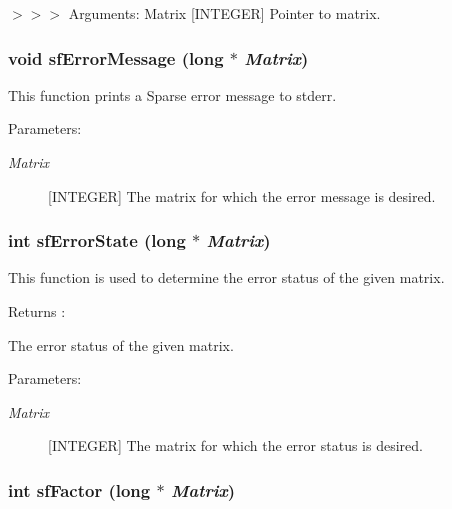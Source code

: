 $>$$>$$>$ Arguments: Matrix [INTEGER] Pointer to matrix. 
\subsubsection{\setlength{\rightskip}{0pt plus 5cm}void sf\-Error\-Message (long $\ast$ {\em Matrix})}\label{spFortran_8c_a76}


This function prints a Sparse error message to stderr.\begin{Desc}
\item[Parameters: ]\par
\begin{description}
\item[{\em 
Matrix}][INTEGER] The matrix for which the error message is desired. \end{description}
\end{Desc}
\subsubsection{\setlength{\rightskip}{0pt plus 5cm}int sf\-Error\-State (long $\ast$ {\em Matrix})}\label{spFortran_8c_a75}


This function is used to determine the error status of the given matrix.

\begin{Desc}
\item[Returns :]\par
[INTEGER or INTEGER$\ast$2] The error status of the given matrix.\end{Desc}
\begin{Desc}
\item[Parameters: ]\par
\begin{description}
\item[{\em 
Matrix}][INTEGER] The matrix for which the error status is desired. \end{description}
\end{Desc}
\subsubsection{\setlength{\rightskip}{0pt plus 5cm}int sf\-Factor (long $\ast$ {\em Matrix})}\label{spFortran_8c_a62}



